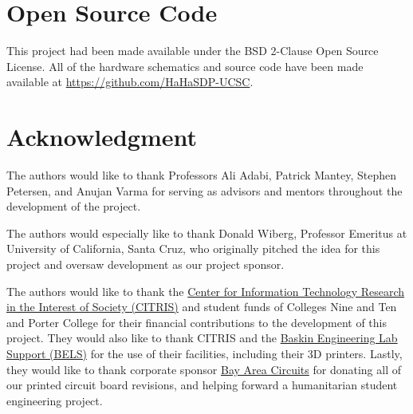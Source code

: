 \documentclass[journal,compsoc]{IEEEtran}
\begin{document}
\section{Open Source Code}
\label{appendixsource}

This project had been made available under the BSD 2-Clause Open Source License. All of the hardware schematics and source code have been made available at \url{https://github.com/HaHaSDP-UCSC}.

\section*{Acknowledgment}

The authors would like to thank Professors Ali Adabi, Patrick Mantey, Stephen Petersen, and Anujan Varma for serving as advisors and mentors throughout the development of the project.

The authors would especially like to thank Donald Wiberg, Professor Emeritus at University of California, Santa Cruz, who originally pitched the idea for this project and oversaw development as our project sponsor.

The authors would like to thank the \href{http://citris-uc.org/campus/uc-santa-cruz}{Center for Information Technology Research in the Interest of Society (CITRIS)} and student funds of Colleges Nine and Ten and Porter College for their financial contributions to the development of this project. They would also like to thank CITRIS and the \href{https://bels.soe.ucsc.edu}{Baskin Engineering Lab Support (BELS)} for the use of their facilities, including their 3D printers. Lastly, they would like to thank corporate sponsor \href{https://bayareacircuits.com}{Bay Area Circuits} for donating all of our printed circuit board revisions, and helping forward a humanitarian student engineering project.

\ifCLASSOPTIONcaptionsoff
  \newpage
\fi




\end{document}
